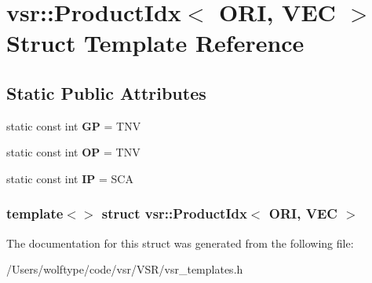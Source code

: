 \hypertarget{structvsr_1_1_product_idx_3_01_o_r_i_00_01_v_e_c_01_4}{\section{vsr\-:\-:Product\-Idx$<$ O\-R\-I, V\-E\-C $>$ Struct Template Reference}
\label{structvsr_1_1_product_idx_3_01_o_r_i_00_01_v_e_c_01_4}
}
\subsection*{Static Public Attributes}
\begin{DoxyCompactItemize}
\item 
\hypertarget{structvsr_1_1_product_idx_3_01_o_r_i_00_01_v_e_c_01_4_ac62168bedd732c42a6e425973cf2c588}{static const int {\bfseries G\-P} = T\-N\-V}\label{structvsr_1_1_product_idx_3_01_o_r_i_00_01_v_e_c_01_4_ac62168bedd732c42a6e425973cf2c588}

\item 
\hypertarget{structvsr_1_1_product_idx_3_01_o_r_i_00_01_v_e_c_01_4_abef152f14e7b049f66c8ad1e0bbd8697}{static const int {\bfseries O\-P} = T\-N\-V}\label{structvsr_1_1_product_idx_3_01_o_r_i_00_01_v_e_c_01_4_abef152f14e7b049f66c8ad1e0bbd8697}

\item 
\hypertarget{structvsr_1_1_product_idx_3_01_o_r_i_00_01_v_e_c_01_4_aec3349bd06b3743e91a01a55e346a33d}{static const int {\bfseries I\-P} = S\-C\-A}\label{structvsr_1_1_product_idx_3_01_o_r_i_00_01_v_e_c_01_4_aec3349bd06b3743e91a01a55e346a33d}

\end{DoxyCompactItemize}
\subsubsection*{template$<$$>$ struct vsr\-::\-Product\-Idx$<$ O\-R\-I, V\-E\-C $>$}



The documentation for this struct was generated from the following file\-:\begin{DoxyCompactItemize}
\item 
/\-Users/wolftype/code/vsr/\-V\-S\-R/vsr\-\_\-templates.\-h\end{DoxyCompactItemize}
